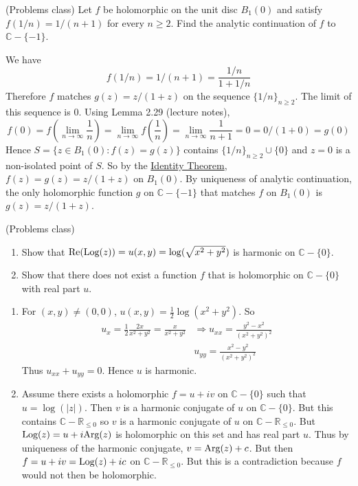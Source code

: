 \begin{example}
	(Problems class) Let $f$ be holomorphic on the unit disc $B_1(0)$ and satisfy $f(1 / n) = 1 / (n + 1)$ for every $n \ge 2$. Find the analytic continuation of $f$ to $\mathbb{C} - \{ -1 \}$.

	We have
	\[
		f(1 / n) = 1 / (n + 1) = \frac{1 / n}{1 + 1 / n}
	\]
	Therefore $f$ matches $g(z) = z / (1 + z)$ on the sequence $\{ 1 / n \}_{n \ge 2}$. The limit of this sequence is $0$. Using Lemma 2.29 (lecture notes),
	\[
		f(0) = f \left( \lim_{n \rightarrow \infty} \frac{1}{n} \right) = \lim_{n \rightarrow \infty} f \left( \frac{1}{n} \right) = \lim_{n \rightarrow \infty} \frac{1}{n + 1} = 0 = 0 / (1 + 0) = g(0)
	\]
	Hence $S = \{ z \in B_1(0): f(z) = g(z) \}$ contains $\{ 1 / n \}_{n \ge 2} \cup \{ 0 \}$ and $z = 0$ is a non-isolated point of $S$. So by the \hyperref[thm:identityTheorem]{Identity Theorem}, $f(z) = g(z) = z / (1 + z)$ on $B_1(0)$. By uniqueness of analytic continuation, the only holomorphic function $g$ on $\mathbb{C} - \{ -1 \}$ that matches $f$ on $B_1(0)$ is $g(z) = z / (1 + z)$.
\end{example}

\begin{example}
	(Problems class)
	\begin{enumerate}
		\item Show that $\text{Re}(\text{Log}(z)) = u(x, y) = \log (\sqrt{x^2 + y^2})$ is harmonic on $\mathbb{C} - \{ 0 \}$.
		\item Show that there does not exist a function $f$ that is holomorphic on $\mathbb{C} - \{ 0 \}$ with real part $u$.
	\end{enumerate}

	\begin{enumerate}
		\item For $(x, y) \ne (0, 0)$, $u(x, y) = \frac{1}{2} \log (x^2 + y^2)$. So
		\[
			\begin{aligned}
				u_x = \frac{1}{2} \frac{2x}{x^2 + y^2} = \frac{x}{x^2 + y^2} & \Longrightarrow u_{xx} = \frac{y^2 - x^2}{{(x^2 + y^2)}^2} \\
				& u_{yy} = \frac{x^2 - y^2}{{(x^2 + y^2)}^2}
			\end{aligned}
		\]
		Thus $u_{xx} + u_{yy} = 0$. Hence $u$ is harmonic.
		\item Assume there exists a holomorphic $f = u + iv$ on $\mathbb{C} - \{ 0 \}$ such that $u = \log(|z|)$. Then $v$ is a harmonic conjugate of $u$ on $\mathbb{C} - \{ 0 \}$. But this contains $\mathbb{C} - \mathbb{R}_{\le 0}$ so $v$ is a harmonic conjugate of $u$ on $\mathbb{C} - \mathbb{R}_{\le 0}$. But $\text{Log}(z) = u + i \text{Arg}(z)$ is holomorphic on this set and has real part $u$. Thus by uniqueness of the harmonic conjugate, $v = \text{Arg}(z) + c$. But then $f = u + iv = \text{Log}(z) + ic$ on $\mathbb{C} - \mathbb{R}_{\le 0}$. But this is a contradiction because $f$ would not then be holomorphic.
	\end{enumerate}
\end{example}

